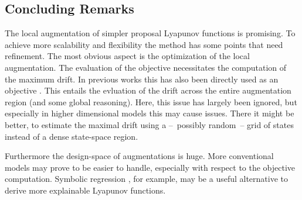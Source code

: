 \subsection{Concluding Remarks}
The local augmentation of simpler proposal Lyapunov functions is promising.
To achieve more scalability and flexibility the method has some
points that need refinement.
The most obvious aspect is the optimization of the local augmentation.
The evaluation of the objective necessitates the computation of the
maximum drift.
In previous works this has also been directly used as an objective
\parencite{milias2014optimization}.
This entails the evluation of the drift across the entire
augmentation region (and some global reasoning).
Here, this issue has largely been ignored, but especially in higher
dimensional models this may cause issues.
There it might be better, to estimate the maximal drift using a
--~possibly random~-- grid of states instead of a dense state-space region.

Furthermore the design-space of augmentations is huge.
More conventional models may prove to be easier to handle, especially
with respect to the objective computation.
Symbolic regression \parencite{pysr}, for example, may be a useful
alternative to derive more explainable Lyapunov functions.

